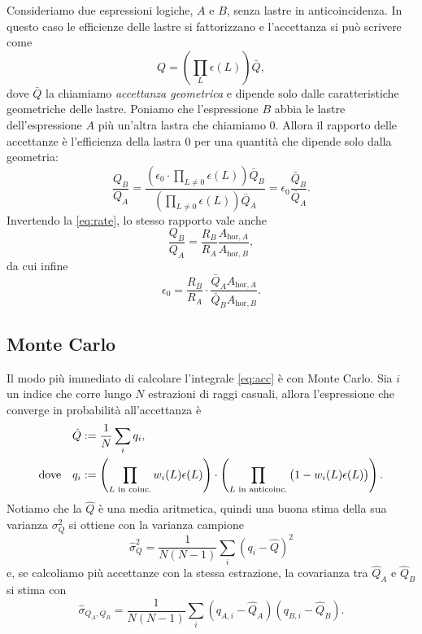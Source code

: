 Consideriamo due espressioni logiche, $A$ e $B$, senza lastre in anticoincidenza.
In questo caso le efficienze delle lastre si fattorizzano e l'accettanza si può scrivere come
\begin{equation*}
	Q = \left( \prod_L \epsilon(L) \right) \bar Q,
\end{equation*}
dove $\bar Q$ la chiamiamo \emph{accettanza geometrica}
e dipende solo dalle caratteristiche geometriche delle lastre.
Poniamo che l'espressione $B$ abbia le lastre dell'espressione $A$ più un'altra lastra che chiamiamo $0$.
Allora il rapporto delle accettanze è l'efficienza della lastra $0$ per una quantità che dipende solo dalla geometria:
\begin{equation*}
	\frac{Q_B}{Q_A} = \frac
	{\left( \epsilon_0 \cdot \prod_{L\neq 0} \epsilon(L) \right) \bar Q_B}
	{\left( \prod_{L\neq 0} \epsilon(L) \right) \bar Q_A}
	= \epsilon_0 \frac{\bar Q_B}{\bar Q_A}.
\end{equation*}
Invertendo la \eqref{eq:rate}, lo stesso rapporto vale anche
\begin{equation*}
	\frac{Q_B}{Q_A} = \frac{R_B}{R_A} \frac{A_{\text{hor},A}}{A_{\text{hor},B}},
\end{equation*}
da cui infine
\begin{equation*}
	\epsilon_0 = \frac{R_B}{R_A} \cdot \frac{\bar Q_A A_{\text{hor},A}}{\bar Q_B A_{\text{hor},B}}.
\end{equation*}

\subsection{Monte Carlo}

Il modo più immediato di calcolare l'integrale \eqref{eq:acc} è con Monte Carlo.
Sia $i$ un indice che corre lungo $N$ estrazioni di raggi casuali,
allora l'espressione che converge in probabilità all'accettanza è
\begin{align}
	\label{eq:accmc}
	\hat Q &:= \frac1N \sum_i q_i, \\
	\text{dove}\quad q_i &:=
	\left( \prod_\text{$L$ in coinc.} w_i(L) \epsilon(L) \right)
	\cdot \left( \prod_\text{$L$ in anticoinc.} \big(1 - w_i(L) \epsilon(L)\big) \right). \notag
\end{align}
Notiamo che la $\hat Q$ è una media aritmetica,
quindi una buona stima della sua varianza $\sigma_Q^2$ si ottiene con la varianza campione
\begin{equation*}
	\hat\sigma_Q^2
	= \frac1{N(N-1)} \sum_i (q_i - \hat Q)^2
\end{equation*}
e, se calcoliamo più accettanze con la stessa estrazione,
la covarianza tra $\hat Q_A$ e $\hat Q_B$ si stima con
\begin{equation*}
	\hat\sigma_{Q_A,Q_B}
	= \frac1{N(N-1)} \sum_i (q_{A,i} - \hat Q_A) (q_{B,i} - \hat Q_B).
\end{equation*}
